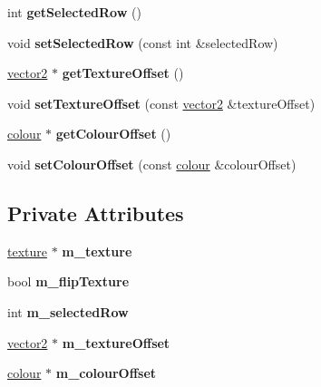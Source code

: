 \begin{DoxyCompactItemize}
int {\bfseries get\+Selected\+Row} ()
\item 
\mbox{\label{classflounder_1_1gui_a27cea6ffb465a8de4cbdfbd69ad2df4e}} 
void {\bfseries set\+Selected\+Row} (const int \&selected\+Row)
\item 
\mbox{\label{classflounder_1_1gui_a7daf537514e6bfb3155a8f63350971e5}} 
\hyperlink{classflounder_1_1vector2}{vector2} $\ast$ {\bfseries get\+Texture\+Offset} ()
\item 
\mbox{\label{classflounder_1_1gui_a850b142bfe51d61f2b4c1dc3676bc2e5}} 
void {\bfseries set\+Texture\+Offset} (const \hyperlink{classflounder_1_1vector2}{vector2} \&texture\+Offset)
\item 
\mbox{\label{classflounder_1_1gui_afcc8ae6ea69dc4b23c672895a476e595}} 
\hyperlink{classflounder_1_1colour}{colour} $\ast$ {\bfseries get\+Colour\+Offset} ()
\item 
\mbox{\label{classflounder_1_1gui_a220cfc75d2d7bb565fbb37d954b08f06}} 
void {\bfseries set\+Colour\+Offset} (const \hyperlink{classflounder_1_1colour}{colour} \&colour\+Offset)
\end{DoxyCompactItemize}
\subsection*{Private Attributes}
\begin{DoxyCompactItemize}
\item 
\mbox{\label{classflounder_1_1gui_a79436b6b873a5fc6b0c539242b1ee98d}} 
\hyperlink{classflounder_1_1texture}{texture} $\ast$ {\bfseries m\+\_\+texture}
\item 
\mbox{\label{classflounder_1_1gui_a3ff46ec0f4992a6b0b0099b02a1a20d3}} 
bool {\bfseries m\+\_\+flip\+Texture}
\item 
\mbox{\label{classflounder_1_1gui_a9574dbb0684eb23cc000707188f1922d}} 
int {\bfseries m\+\_\+selected\+Row}
\item 
\mbox{\label{classflounder_1_1gui_aa7281add10d424b2c44571a549857dbc}} 
\hyperlink{classflounder_1_1vector2}{vector2} $\ast$ {\bfseries m\+\_\+texture\+Offset}
\item 
\mbox{\label{classflounder_1_1gui_a075aab9ab9b066143ccce77cd6dca6dd}} 
\hyperlink{classflounder_1_1colour}{colour} $\ast$ {\bfseries m\+\_\+colour\+Offset}
\end{DoxyCompactItemize}


